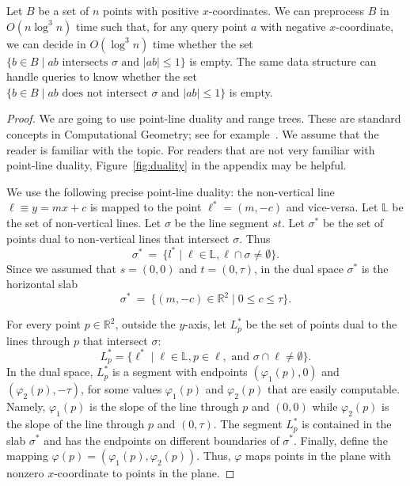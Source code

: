 \documentclass[a4paper,USenglish]{lipics}
\newcommand{\RR}{\ensuremath{\mathbb R}}  %
\newcommand{\LL}{\ensuremath{\mathbb L}}  %
\let\le\leqslant
\begin{document}
\begin{lemma}
\label{lem:block}
	Let $B$ be a set of $n$ points with positive $x$-coordinates.
	We can preprocess $B$ in $O(n\log^3 n)$ time such that,
	for any query point $a$	with negative $x$-coordinate, 
	we can decide in $O(\log^3 n)$ time whether the set 
	$\{ b\in B \mid \text{$ab$ intersects $\sigma$ and $|ab|\le 1$}\}$
	is empty.
	The same data structure can handle queries
	to know whether the set
	$\{ b\in B \mid \text{$ab$ does not intersect $\sigma$ and $|ab|\le 1$}\}$
	is empty.
\end{lemma}
\begin{proof}
	We are going to use point-line duality and range trees.
	These are standard concepts in Computational Geometry;
	see for example~\cite[Chapters 5 and 8]{bkos-08}.
	We assume that the reader is familiar with the topic.
	For readers that are not very familiar with point-line duality,
	Figure~\ref{fig:duality} in the appendix may be helpful.
	
	We use the following precise point-line duality: 
	the non-vertical line $\ell \equiv y=mx+c$ 
	is mapped to the point $\ell^*=(m,-c)$ and
	vice-versa. 
	Let $\LL$ be the set of non-vertical lines.
	Let $\sigma$ be the line segment $st$.
	Let $\sigma^*$ be the set of points dual to non-vertical lines that intersect $\sigma$.
	Thus
	\[
		\sigma^* ~=~ \{ l^* \mid \ell\in \LL, \ell\cap \sigma\neq \emptyset\}.
	\]
	Since we assumed that $s=(0,0)$ and $t=(0,\tau)$, 
	in the dual space $\sigma^*$ is the horizontal slab 
	\[
		\sigma^* ~=~ \{ (m,-c)\in \RR^2\mid 0\le c\le \tau\}.
	\]
	
	For every point $p\in \RR^2$, outside the $y$-axis, 
	let $L^* _p$ be the set of points dual
	to the lines through $p$ that intersect $\sigma$:
	\[
		L^*_p=\{ \ell^* \mid \ell\in \LL, p \in \ell, \text{ and } \sigma\cap \ell\not= \emptyset\}.
	\]
	In the dual space, $L^*_p$ is a segment with endpoints 
	$(\varphi_1(p),0)$ and $(\varphi_2(p),-\tau)$, 
	for some values $\varphi_1(p)$ and $\varphi_2(p)$
	that are easily computable.
	Namely, $\varphi_1(p)$ is the slope of the line through $p$
	and $(0,0)$ while $\varphi_2(p)$ is the slope of the line through $p$ and $(0,\tau)$.
	The segment $L^*_p$ is contained in the slab $\sigma^*$ and has the endpoints on
	different boundaries of $\sigma^*$.
	Finally, define the mapping $\varphi(p)=(\varphi_1(p),\varphi_2(p))$.
	Thus, $\varphi$ maps points in the plane with nonzero $x$-coordinate
	to points in the plane. 


\end{proof}
\end{document}

